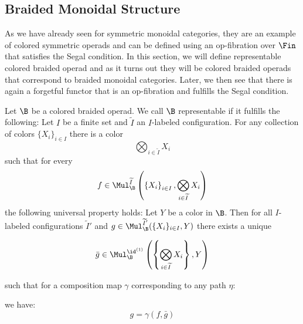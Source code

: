 \subsection{Braided Monoidal Structure}

As we have already seen for symmetric monoidal categories, they are an example
of colored symmetric operads and can be defined using an op-fibration over
$\Fin$ that satisfies the Segal condition. In this section, we will define
representable colored braided operad and as it turns out they will be colored
braided operads that correspond to braided monoidal categories. Later, we then
see that there is again a forgetful functor that is an op-fibration and
fulfills the Segal condition.

\begin{defin}
    Let $\B$ be a colored braided operad. We call $\B$ representable if it
    fulfills the following: Let $I$ be a finite set and $\widetilde{I}$ an
    $I$-labeled configuration. For any collection of colors $\{X_i\}_{i \in I}$
    there is a color 
    $$\bigotimes_{i \in \widetilde{I}} X_i$$ such that for every  
    $$f \in \Mul_{\B}^{\widetilde{I}}\left(\left\{X_i\right\}_{i \in I},
    \bigotimes_{i \in \widetilde{I}} X_i\right)$$ the following universal
    property holds: Let $Y$ be a color in $\B$. Then for all $I$-labeled
    configurations $\widetilde{I}'$ and $g \in
    \Mul_{\B}^{\widetilde{I}'}(\{X_i\}_{i \in I}, Y)$ there exists a unique

    $$\bar{g} \in \Mul_{\B}^{\id^{(1)}}\left(\left\{\bigotimes_{i \in \widetilde{I}}
    X_i\right\}, Y\right)$$

    such that for a composition map $\gamma$ corresponding to any path $\eta$:
    \begin{center}
    \end{center}
    we have:
    \[
        g = \gamma(f, \bar{g})
    \]
\end{defin}

